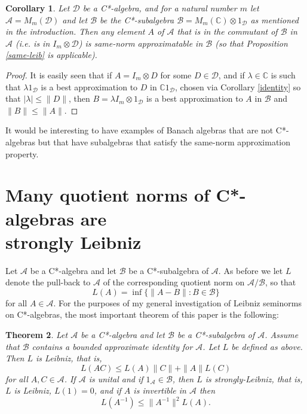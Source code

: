 \documentclass[12pt]{amsart}
\newcommand{\<}{\langle}
\renewcommand{\>}{\rangle}
\renewcommand{\l}{\lambda}
\newcommand{\cA}{{\mathcal A}}
\newcommand{\cB}{{\mathcal B}}
\newcommand{\cD}{{\mathcal D}}
\newcommand{\bC}{{\mathbb C}}
\newtheorem{theorem}{Theorem}[section]
\newtheorem{corollary}[theorem]{Corollary}
\theoremstyle{definition}   %
\begin{document}
\begin{corollary}
\label{commutator}
Let $\cD$ be a C*-algebra, and for a natural number $m$ 
let $\cA = M_m(\cD)$ and let $\cB$ be the 
C*-subalgebra $\cB = M_m(\bC) \otimes 1_\cD$
as mentioned in the introduction.  Then any element $A$ of $\cA$ that is
in the commutant of $\cB$ in $\cA$ (i.e. is in $I_m \otimes \cD$)
is same-norm approximatable in $\cB$ (so that Proposition \ref{same-leib}
is applicable).
\end{corollary}

\begin{proof}
It is easily seen that if $A = I_m\otimes D$ for some $D \in \cD$, and if
$\l \in \bC$ is such that $\l 1_\cD$ is a best approximation to $D$ in $\bC 1_\cD$, chosen via Corollary \ref{identity} so that $|\l | \leq \|D\|$, 
then $B = \l I_m \otimes 1_\cD$ is a best approximation to $A$ in $\cB$
and $\|B\| \leq \|A\|$.
\end{proof}

It would be interesting to have examples of Banach algebras that
are not C*-algebras but that have subalgebras
that satisfy the same-norm approximation property.


\section{Many quotient norms of C*-algebras  are \\
strongly Leibniz}
\label{secC^*}

Let $\cA$ be a C*-algebra and let $\cB$ be a C*-subalgebra of $\cA$. 
As before we
let $L$ denote the pull-back to $\cA$ of the corresponding quotient norm
on $\cA/\cB$, so that 
\[
L(A) = \inf \{\|A-B\|: B \in \cB\}  
\]
for all $A \in \cA$. 
For the purposes of my general investigation of Leibniz
seminorms on C*-algebras, the most important theorem of this paper is the following:

\begin{theorem}
\label{thmMain}
Let $\cA$ be a C*-algebra and let $\cB$ be a C*-subalgebra of $\cA$. 
Assume that $\cB$ contains a bounded approximate identity for $\cA$.
Let $L$ be defined as above. Then $L$ is Leibniz, that
is,
\[
L(AC) \leq L(A)\|C\| + \|A\|L(C)
\]
for all $A, C \in \cA$. If $\cA$ is unital and if $1_\cA \in \cB$, then $L$ is
strongly-Leibniz, that is, $L$ is Leibniz, $L(1) = 0$, and
if $A$ is invertible in $\cA$ then
\[
L(A^{-1}) \leq \|A^{-1}\|^2L(A)  .
\]
\end{theorem}
\end{document}
